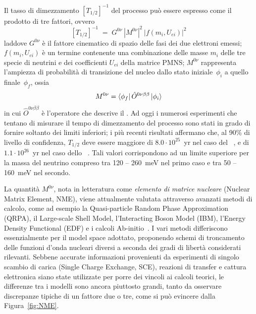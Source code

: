 Il tasso di dimezzamento $ \left[ T_{1/2} \right]^{-1} $ del processo \doppiobeta{} può essere espresso come il prodotto di tre fattori, ovvero
\begin{equation} \label{eq:rate_doppio_beta}
	\left[ T_{1/2} \right]^{-1} \; = \; G^{0 \nu} \: \left| M^{0 \nu} \right|^2 \: \left| f ( m_i, U_{ei}) \right|^2 
\end{equation}
laddove $G^{0 \nu}$ è il fattore cinematico di spazio delle fasi dei due elettroni emessi; $ f ( m_i, U_{ei}) $ è un termine contenente una combinazione delle masse $m_i$ delle tre specie di neutrini e dei coefficienti $U_{ei}$ della matrice PMNS; $M^{0 \nu}$ rappresenta l'ampiezza di probabilità di transizione del nucleo dallo stato iniziale~$\phi_i$ a quello finale~$\phi_f$, ossia
\begin{equation}
	M^{0 \nu} = \bra{\phi_f} \hat{O}^{0 \nu \beta \beta} \ket{\phi_i} 
\end{equation}
in cui $\hat{O}^{0 \nu \beta \beta}$ è l'operatore che descrive il \doppiobeta{}. 
Ad oggi i numerosi esperimenti che tentano di misurare il tempo di dimezzamento del processo sono stati in grado di fornire soltanto dei limiti inferiori; i più recenti risultati affermano che, al 90\% di livello di confidenza, $T_{1/2}$ deve essere maggiore di $8.0 \cdot 10^{25}$~yr nel caso del ~\cite{agostini:prl18}, e di $1.1 \cdot 10^{26}$~yr nel caso dello ~\cite{gando:prl16}. Tali valori corrispondono ad un limite superiore per la massa del neutrino compreso tra 120 -- 260~meV nel primo caso e tra 50 -- 160~meV nel secondo.




La quantità $M^{0 \nu}$, nota in letteratura come \emph{elemento di matrice nucleare} (Nuclear Matrix Element, NME), viene attualmente valutata attraverso avanzati metodi di calcolo, come ad esempio la Quasi-particle Random Phase Approximation (QRPA), il Large-scale Shell Model, l'Interacting Boson Model (IBM), l'Energy Density Functional (EDF) e i calcoli Ab-initio~\cite{caurier:prl08,suhonen:ijmpe08,vaquero:prl14,barea:prc13,kwiatkowski:prc14}. I vari metodi differiscono essenzialmente per il model space adottato, proponendo schemi di troncamento delle funzioni d'onda nucleari diversi a seconda dei gradi di libertà considerati rilevanti. 
Sebbene accurate informazioni provenienti da esperimenti di singolo scambio di carica (Single Charge Exchange, SCE), reazioni di transfer e cattura elettronica siano state utilizzate per porre dei vincoli ai calcoli teorici, le differenze tra i modelli sono ancora piuttosto grandi, tanto da osservare discrepanze tipiche di un fattore due o tre, come si può evincere dalla Figura~\ref{fig:NME}. 

